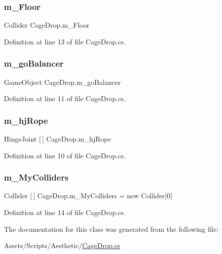 \subsubsection{\texorpdfstring{m\+\_\+\+Floor}{m\_Floor}}
{\footnotesize\ttfamily Collider Cage\+Drop.\+m\+\_\+\+Floor}



Definition at line 13 of file Cage\+Drop.\+cs.

\mbox{\label{class_cage_drop_a5f17536752f100ab73e38f65ab377006}} 
\subsubsection{\texorpdfstring{m\+\_\+go\+Balancer}{m\_goBalancer}}
{\footnotesize\ttfamily Game\+Object Cage\+Drop.\+m\+\_\+go\+Balancer}



Definition at line 11 of file Cage\+Drop.\+cs.

\mbox{\label{class_cage_drop_a0de7acd4bc329164d0d5c05f45ad7306}} 
\subsubsection{\texorpdfstring{m\+\_\+hj\+Rope}{m\_hjRope}}
{\footnotesize\ttfamily Hinge\+Joint \mbox{[}$\,$\mbox{]} Cage\+Drop.\+m\+\_\+hj\+Rope}



Definition at line 10 of file Cage\+Drop.\+cs.

\mbox{\label{class_cage_drop_aff9e0ceae69798752d6fd61ac27263a0}} 
\subsubsection{\texorpdfstring{m\+\_\+\+My\+Colliders}{m\_MyColliders}}
{\footnotesize\ttfamily Collider \mbox{[}$\,$\mbox{]} Cage\+Drop.\+m\+\_\+\+My\+Colliders = new Collider\mbox{[}0\mbox{]}}



Definition at line 14 of file Cage\+Drop.\+cs.



The documentation for this class was generated from the following file\+:\begin{DoxyCompactItemize}
\item 
Assets/\+Scripts/\+Aesthetic/\mbox{\hyperlink{_cage_drop_8cs}{Cage\+Drop.\+cs}}\end{DoxyCompactItemize}
